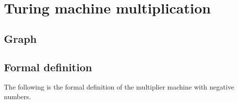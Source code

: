 \documentclass[11pt]{article}
\begin{document}
\date{}
\maketitle

\tableofcontents
\pagebreak

\section{Turing machine multiplication}
\subsection{Graph}
\begin{center}
\end{center}

\subsection{Formal definition}
The following is the formal definition of the multiplier machine with negative numbers.
\end{document}
